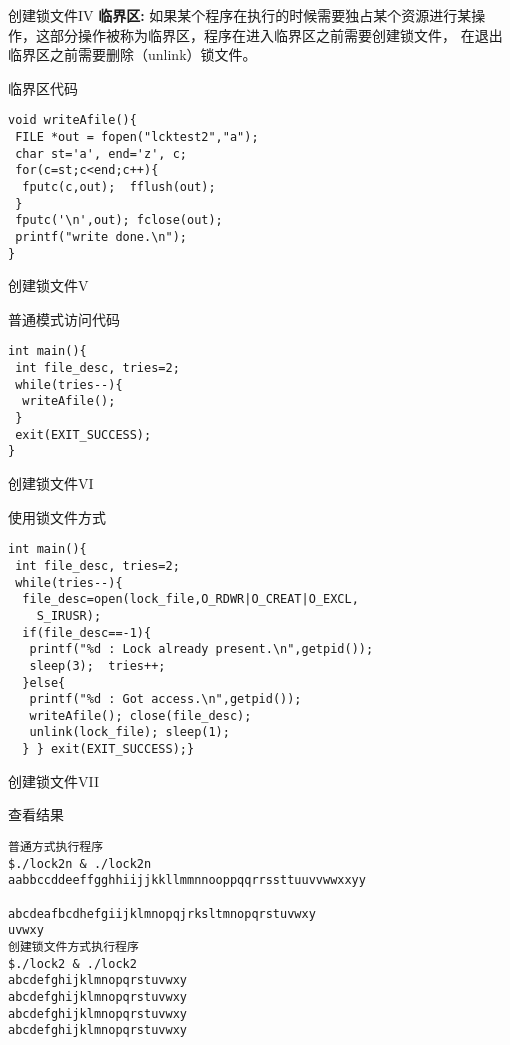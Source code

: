 \documentclass{beamer}
\begin{document}
\begin{frame}[fragile]{创建锁文件IV}
\textbf{临界区:}
如果某个程序在执行的时候需要独占某个资源进行某操作，这部分操作被称为临界区，程序在进入临界区之前需要创建锁文件，
在退出临界区之前需要删除（unlink）锁文件。
\begin{block}{临界区代码}
\begin{lstlisting}
void writeAfile(){
 FILE *out = fopen("lcktest2","a");
 char st='a', end='z', c;
 for(c=st;c<end;c++){
  fputc(c,out);  fflush(out);
 }
 fputc('\n',out); fclose(out);
 printf("write done.\n");
}
\end{lstlisting}
\end{block}
\end{frame}
\begin{frame}[fragile]{创建锁文件V}
\begin{block}{普通模式访问代码}
\begin{lstlisting}
int main(){
 int file_desc, tries=2;
 while(tries--){
  writeAfile();
 }
 exit(EXIT_SUCCESS);
}
\end{lstlisting}
\end{block}
\end{frame}
\begin{frame}[fragile]{创建锁文件VI}
\begin{block}{使用锁文件方式}
\begin{lstlisting}
int main(){
 int file_desc, tries=2;
 while(tries--){
  file_desc=open(lock_file,O_RDWR|O_CREAT|O_EXCL,
    S_IRUSR);
  if(file_desc==-1){
   printf("%d : Lock already present.\n",getpid());
   sleep(3);  tries++;
  }else{
   printf("%d : Got access.\n",getpid());
   writeAfile(); close(file_desc);
   unlink(lock_file); sleep(1);
  } } exit(EXIT_SUCCESS);}
\end{lstlisting}
\end{block}
\end{frame}
\begin{frame}[fragile]{创建锁文件VII}
\label{filelock}
\begin{block}{查看结果}
\begin{lstlisting}
普通方式执行程序
$./lock2n & ./lock2n
aabbccddeeffgghhiijjkkllmmnnooppqqrrssttuuvvwwxxyy

abcdeafbcdhefgiijklmnopqjrksltmnopqrstuvwxy
uvwxy
创建锁文件方式执行程序
$./lock2 & ./lock2
abcdefghijklmnopqrstuvwxy
abcdefghijklmnopqrstuvwxy
abcdefghijklmnopqrstuvwxy
abcdefghijklmnopqrstuvwxy
\end{lstlisting}
\end{block}
\end{frame}
\end{document}
